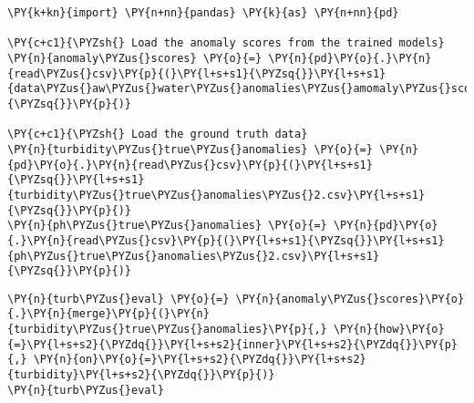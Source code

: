     \begin{tcolorbox}[breakable, size=fbox, boxrule=1pt, pad at break*=1mm,colback=cellbackground, colframe=cellborder]
\begin{Verbatim}[commandchars=\\\{\}]
\PY{k+kn}{import} \PY{n+nn}{pandas} \PY{k}{as} \PY{n+nn}{pd}

\PY{c+c1}{\PYZsh{} Load the anomaly scores from the trained models}
\PY{n}{anomaly\PYZus{}scores} \PY{o}{=} \PY{n}{pd}\PY{o}{.}\PY{n}{read\PYZus{}csv}\PY{p}{(}\PY{l+s+s1}{\PYZsq{}}\PY{l+s+s1}{data\PYZus{}aw\PYZus{}water\PYZus{}anomalies\PYZus{}amomaly\PYZus{}scores.csv}\PY{l+s+s1}{\PYZsq{}}\PY{p}{)}

\PY{c+c1}{\PYZsh{} Load the ground truth data}
\PY{n}{turbidity\PYZus{}true\PYZus{}anomalies} \PY{o}{=} \PY{n}{pd}\PY{o}{.}\PY{n}{read\PYZus{}csv}\PY{p}{(}\PY{l+s+s1}{\PYZsq{}}\PY{l+s+s1}{turbidity\PYZus{}true\PYZus{}anomalies\PYZus{}2.csv}\PY{l+s+s1}{\PYZsq{}}\PY{p}{)}
\PY{n}{ph\PYZus{}true\PYZus{}anomalies} \PY{o}{=} \PY{n}{pd}\PY{o}{.}\PY{n}{read\PYZus{}csv}\PY{p}{(}\PY{l+s+s1}{\PYZsq{}}\PY{l+s+s1}{ph\PYZus{}true\PYZus{}anomalies\PYZus{}2.csv}\PY{l+s+s1}{\PYZsq{}}\PY{p}{)}
\end{Verbatim}
\end{tcolorbox}

    \begin{tcolorbox}[breakable, size=fbox, boxrule=1pt, pad at break*=1mm,colback=cellbackground, colframe=cellborder]
\begin{Verbatim}[commandchars=\\\{\}]
\PY{n}{turb\PYZus{}eval} \PY{o}{=} \PY{n}{anomaly\PYZus{}scores}\PY{o}{.}\PY{n}{merge}\PY{p}{(}\PY{n}{turbidity\PYZus{}true\PYZus{}anomalies}\PY{p}{,} \PY{n}{how}\PY{o}{=}\PY{l+s+s2}{\PYZdq{}}\PY{l+s+s2}{inner}\PY{l+s+s2}{\PYZdq{}}\PY{p}{,} \PY{n}{on}\PY{o}{=}\PY{l+s+s2}{\PYZdq{}}\PY{l+s+s2}{turbidity}\PY{l+s+s2}{\PYZdq{}}\PY{p}{)}
\PY{n}{turb\PYZus{}eval}
\end{Verbatim}
\end{tcolorbox}

